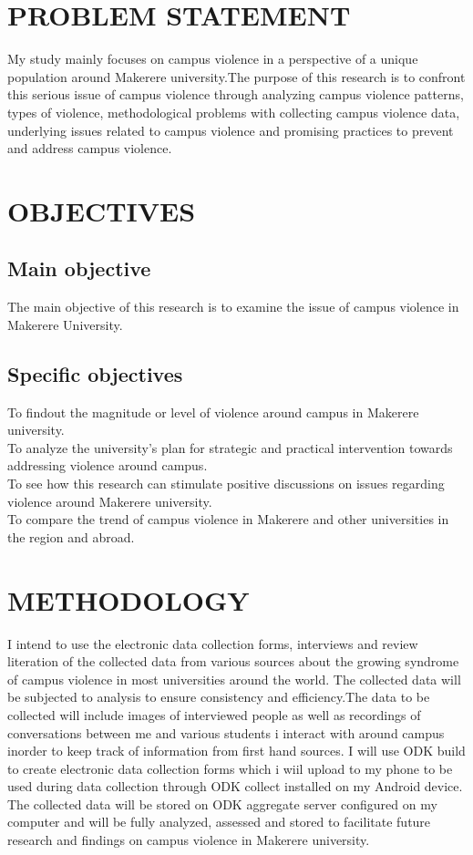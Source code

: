 \documentclass[10pt]{article}
\begin{document}
\section{PROBLEM STATEMENT}
{My study mainly focuses on campus violence in a perspective of a unique population around Makerere university.The purpose of this research is to confront this serious issue of campus violence through analyzing campus violence patterns, types of violence, methodological problems with collecting campus violence data, underlying issues related to campus violence and promising practices to prevent and address campus violence.
}

\section{OBJECTIVES}
\subsection{Main objective}
{The main objective of this research is to examine the issue of campus violence in Makerere University.}
\subsection{Specific objectives}
{   To findout the magnitude or level of violence around campus in Makerere university.\\
	To analyze the university's plan for strategic and practical intervention towards addressing violence around campus.\\
	To see how this research can stimulate positive discussions on issues regarding  violence around Makerere university.\\ 
	To compare the trend of campus violence in Makerere and other universities in the region and abroad.
}
\section{METHODOLOGY}
{I intend to use the electronic data collection forms, interviews and review literation of the collected data from various sources about the growing syndrome of  campus violence in most universities around the world. The collected data will be subjected to analysis to ensure consistency and efficiency.The data to be collected will include images of interviewed people as well as recordings of conversations between me and various students i interact with around campus inorder to keep track of information from first hand sources. I will use ODK build to create electronic data collection forms which i wiil upload to my phone to be used during data collection through ODK collect installed on my Android device. The collected data will be stored on ODK aggregate server configured on my computer and will be fully analyzed, assessed and stored to facilitate future research and findings on campus violence in Makerere university.}
\end{document}

